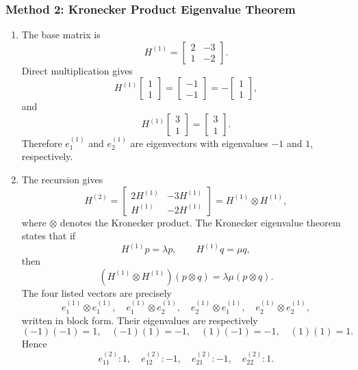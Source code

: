 \documentclass[12pt]{article}
\begin{document}
\newpage
\subsubsection{Method 2: Kronecker Product Eigenvalue Theorem}
\begin{enumerate}[label=(\alph*)]
  \item The base matrix is
  \[
  H^{(1)}=\begin{bmatrix}2&-3\\1&-2\end{bmatrix}.
  \]
  Direct multiplication gives
  \[
  H^{(1)}\begin{bmatrix}1\\1\end{bmatrix}=\begin{bmatrix}-1\\-1\end{bmatrix}
  =-\begin{bmatrix}1\\1\end{bmatrix},
  \]
  and
  \[
  H^{(1)}\begin{bmatrix}3\\1\end{bmatrix}=\begin{bmatrix}3\\1\end{bmatrix}.
  \]
  Therefore $e_1^{(1)}$ and $e_2^{(1)}$ are eigenvectors with eigenvalues $-1$ and $1$, respectively.

  \item The recursion gives
  \[
  H^{(2)}=
  \begin{bmatrix}2H^{(1)}&-3H^{(1)}\\H^{(1)}&-2H^{(1)}\end{bmatrix}
  =H^{(1)}\otimes H^{(1)},
  \]
  where $\otimes$ denotes the Kronecker product. The Kronecker eigenvalue theorem states that if
  \[
  H^{(1)}p=\lambda p,
  \qquad
  H^{(1)}q=\mu q,
  \]
  then
  \[
  (H^{(1)}\otimes H^{(1)})(p\otimes q)=\lambda\mu(p\otimes q).
  \]
  The four listed vectors are precisely
  \[
  e_1^{(1)}\otimes e_1^{(1)},
  \quad
  e_1^{(1)}\otimes e_2^{(1)},
  \quad
  e_2^{(1)}\otimes e_1^{(1)},
  \quad
  e_2^{(1)}\otimes e_2^{(1)},
  \]
  written in block form. Their eigenvalues are respectively
  \[
  (-1)(-1)=1,
  \quad
  (-1)(1)=-1,
  \quad
  (1)(-1)=-1,
  \quad
  (1)(1)=1.
  \]
  Hence
  \[
  \boxed{e_{11}^{(2)}:1,
  \quad e_{12}^{(2)}:-1,
  \quad e_{21}^{(2)}:-1,
  \quad e_{22}^{(2)}:1.}
  \]


\end{enumerate}
\end{document}
